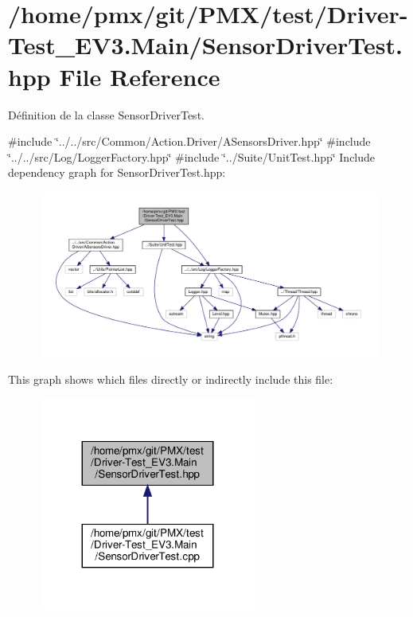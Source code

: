 \hypertarget{Driver-Test__EV3_8Main_2SensorDriverTest_8hpp}{}\section{/home/pmx/git/\+P\+M\+X/test/\+Driver-\/\+Test\+\_\+\+E\+V3.Main/\+Sensor\+Driver\+Test.hpp File Reference}
\label{Driver-Test__EV3_8Main_2SensorDriverTest_8hpp}


Définition de la classe Sensor\+Driver\+Test.  


{\ttfamily \#include \char`\"{}../../src/\+Common/\+Action.\+Driver/\+A\+Sensors\+Driver.\+hpp\char`\"{}}\newline
{\ttfamily \#include \char`\"{}../../src/\+Log/\+Logger\+Factory.\+hpp\char`\"{}}\newline
{\ttfamily \#include \char`\"{}../\+Suite/\+Unit\+Test.\+hpp\char`\"{}}\newline
Include dependency graph for Sensor\+Driver\+Test.\+hpp\+:
\nopagebreak
\begin{figure}[H]
\begin{center}
\leavevmode
\includegraphics[width=350pt]{Driver-Test__EV3_8Main_2SensorDriverTest_8hpp__incl}
\end{center}
\end{figure}
This graph shows which files directly or indirectly include this file\+:
\nopagebreak
\begin{figure}[H]
\begin{center}
\leavevmode
\includegraphics[width=203pt]{Driver-Test__EV3_8Main_2SensorDriverTest_8hpp__dep__incl}
\end{center}
\end{figure}
